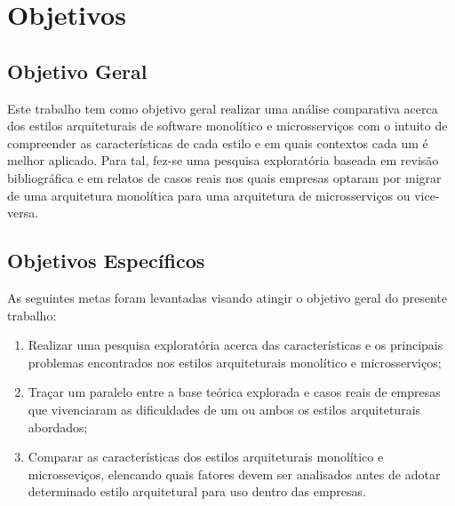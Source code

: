 \section{Objetivos}
\label{sec:Objetivos}

\subsection{Objetivo Geral}
\label{sec:ObjetivoGeral}

Este trabalho tem como objetivo geral realizar uma análise comparativa acerca dos estilos
arquiteturais de software monolítico e microsserviços com o intuito de compreender as
características de cada estilo e em quais contextos cada um é melhor aplicado. Para tal, fez-se
uma pesquisa exploratória baseada em revisão bibliográfica e em relatos de casos reais nos
quais empresas optaram por migrar de uma arquitetura monolítica para uma arquitetura de
microsserviços ou vice-versa.

\subsection{Objetivos Específicos}

As seguintes metas foram levantadas visando atingir o objetivo geral do presente
trabalho:

  \begin{enumerate}
      \item Realizar uma pesquisa exploratória acerca das características e os principais problemas
          encontrados nos estilos arquiteturais monolítico e microsserviços;
      \item Traçar um paralelo entre a base teórica explorada e casos reais de empresas que
          vivenciaram as dificuldades de um ou ambos os estilos arquiteturais abordados;
      \item Comparar as características dos estilos arquiteturais monolítico e microsseviços,
          elencando quais fatores devem ser analisados antes de adotar determinado estilo
          arquitetural para uso dentro das empresas.
  \end{enumerate}
